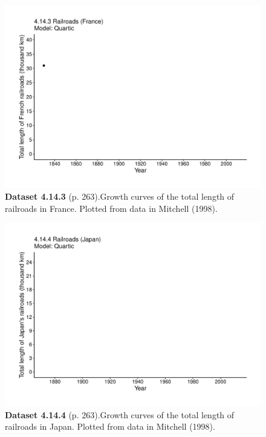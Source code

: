 \documentclass[aps,rmp,preprint,superscriptaddress,10pt,onecolumn]{article}
\begin{document}
\clearpage
\begin{figure}[h]
\includegraphics[width=\textwidth]{output/figs-ggplot/4.14.3.pdf}
\caption*{\textbf{Dataset 4.14.3} (p. 263).Growth curves of the total length of railroads in France. Plotted from data in Mitchell (1998).}
\end{figure}
	
\clearpage
\begin{figure}[h]
\includegraphics[width=\textwidth]{output/figs-ggplot/4.14.4.pdf}
\caption*{\textbf{Dataset 4.14.4} (p. 263).Growth curves of the total length of railroads in Japan. Plotted from data in Mitchell (1998).}
\end{figure}
	
\end{document}
